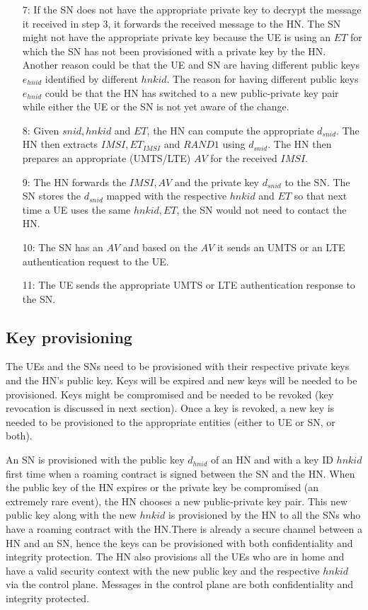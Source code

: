\documentclass{river-journal}
\begin{document}
\begin{itemize}
\item[7:] If the SN does not have the appropriate private key to decrypt the message it received in step $3$, it forwards the received message to the HN. The SN might not have the appropriate private key because the UE is using an $ET$ for which the SN has not been provisioned with a private key by the HN. Another reason could be that the UE and SN are having different public keys $e_{hnid}$ identified by different $hnkid$. The reason for having different public keys $e_{hnid}$ could be that the HN has switched to a new public-private key pair while either the UE or the SN is not yet aware of the change.
\item[8:] Given $snid,hnkid$ and $ET$, the HN can compute the appropriate $d_{snid}$. The HN then extracts $IMSI,ET_{IMSI}$ and $RAND1$ using $d_{snid}$. The HN then prepares an appropriate (UMTS/LTE) $AV$ for the received $IMSI$.
\item[9:] The HN forwards the $IMSI,AV$ and the private key $d_{snid}$ to the SN. The SN stores the $d_{snid}$ mapped with the respective $hnkid$ and $ET$ so that next time a UE uses the same $hnkid,ET$, the SN would not need to contact the HN.
\item[10:] The SN has an $AV$ and based on the $AV$ it sends an UMTS or an LTE authentication request to the UE.
\item[11:] The UE sends the appropriate UMTS or LTE authentication response to the SN.
\end{itemize}


\subsection{Key provisioning}
The UEs and the SNs need to be provisioned with their respective private keys and the HN's public key. Keys will be expired and new keys will be needed to be provisioned. Keys might be compromised and be needed to be revoked (key revocation is discussed in next section). Once a key is revoked, a new key is needed to be provisioned to the appropriate entities (either to UE or SN, or both).

An SN is provisioned with the public key $d_{hnid}$ of an HN and with a key ID $hnkid$ first time when a roaming contract is signed between the SN and the HN. When the public key of the HN expires or the private key be compromised (an extremely rare event), the HN chooses a new public-private key pair. This new public key along with the new $hnkid$ is provisioned by the HN to all the SNs who have a roaming contract with the HN.There is already a secure channel between a HN and an SN, hence the keys can be provisioned with both confidentiality and integrity protection. The HN also provisions all the UEs who are in home and have a valid security context with the new public key and the respective $hnkid$ via the control plane. Messages in the control plane are both confidentiality and integrity protected.
\end{document}
